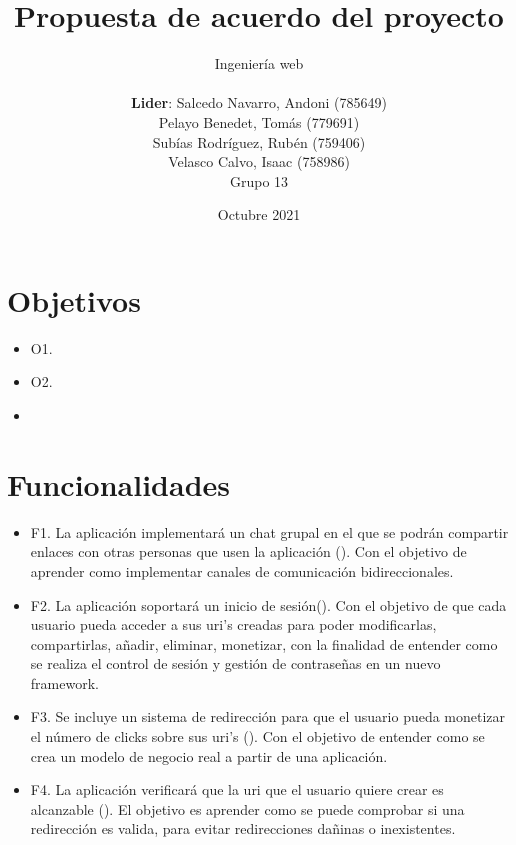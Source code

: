 \documentclass{article}
\title{Propuesta de acuerdo del proyecto}
\author{Ingeniería web\\\\\textbf{Lider}: Salcedo Navarro, Andoni (785649)\\Pelayo Benedet, Tomás (779691)\\Subías Rodríguez, Rubén (759406)\\Velasco Calvo, Isaac (758986)\\Grupo 13}
\date{Octubre 2021}
\begin{document}
 
\maketitle
 
\pagebreak
 

\section*{Objetivos}


\begin{itemize}
    \item O1.
    \item O2.
    \item 
\end{itemize}

\section*{Funcionalidades}



\begin{itemize}
    \item F1. La aplicación implementará un chat grupal en el que se podrán compartir enlaces con otras personas que usen la aplicación (). Con el objetivo de aprender como implementar canales de comunicación bidireccionales.
    \item F2. La aplicación soportará un inicio de sesión(). Con el objetivo de que cada usuario pueda acceder a sus uri's creadas para poder modificarlas, compartirlas, añadir, eliminar, monetizar, con la finalidad de entender como se realiza el control de sesión y gestión de contraseñas en un nuevo framework.
    \item F3. Se incluye un sistema de redirección para que el usuario pueda monetizar el número de clicks sobre sus uri's (). Con el objetivo de entender como se crea un modelo de negocio real a partir de una aplicación.
    \item F4. La aplicación verificará que la uri que el usuario quiere crear es alcanzable (). El objetivo es aprender como se puede comprobar si una redirección es valida, para evitar redirecciones dañinas o inexistentes.
\end{itemize}
\end{document}
